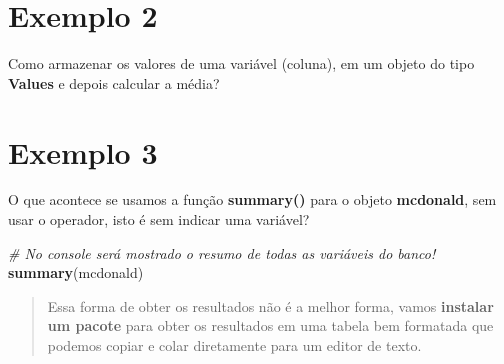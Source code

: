 \documentclass[
]{book}
\newenvironment{Shaded}{\begin{snugshade}}{\end{snugshade}}
\newcommand{\CommentTok}[1]{\textcolor[rgb]{0.56,0.35,0.01}{\textit{#1}}}
\newcommand{\FunctionTok}[1]{\textcolor[rgb]{0.13,0.29,0.53}{\textbf{#1}}}
\newcommand{\NormalTok}[1]{#1}
\newcommand{\OtherTok}[1]{\textcolor[rgb]{0.56,0.35,0.01}{#1}}
\newcommand{\SpecialCharTok}[1]{\textcolor[rgb]{0.81,0.36,0.00}{\textbf{#1}}}
\begin{document}
\begin{Shaded}
\end{Shaded}

\section{Exemplo 2}\label{exemplo-2-1}

Como armazenar os valores de uma variável (coluna), em um objeto do tipo \textbf{Values} e depois calcular a média?

\begin{Shaded}
\end{Shaded}

\section{Exemplo 3}\label{exemplo-3-1}

O que acontece se usamos a função \textbf{summary()} para o objeto \textbf{mcdonald}, sem usar o operador, isto é sem indicar uma variável?

\begin{Shaded}
\begin{Highlighting}[]
\CommentTok{\# No console será mostrado o resumo de todas as variáveis do banco!}
\FunctionTok{summary}\NormalTok{(mcdonald)}
\end{Highlighting}
\end{Shaded}

\begin{quote}
Essa forma de obter os resultados não é a melhor forma, vamos \textbf{instalar um pacote} para obter os resultados em uma tabela bem formatada que podemos copiar e colar diretamente para um editor de texto.
\end{quote}
\end{document}
